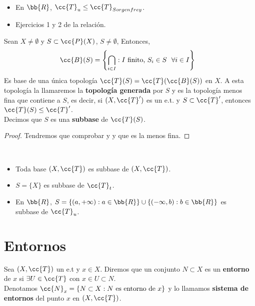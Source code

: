 \begin{ejemplo}\
    \begin{itemize}
        \item En $\bb{R}$, $\cc{T}_u \leq \cc{T}_{Sorgenfrey}$.
        \item Ejercicios 1 y 2 de la relación.
    \end{itemize}
    \endsquare
\end{ejemplo}

\begin{prop}
    Sean $X\neq \emptyset$ y $S\subset \cc{P}(X)$, $S\neq \emptyset$, Entonces, 
    \begin{gather*}
        \cc{B}(S)=\left\{\bigcap\limits_{i\in I}: I \text{ finito, }S_i \in S\ \ \forall i \in I\right\}
    \end{gather*}
    Es base de una única topología $\cc{T}(S)=\cc{T}(\cc{B}(S))$ en $X$. A esta topología la llamaremos la \textbf{topología generada} por $S$ y es la topología menos fina que contiene a $S$, es decir, si $(X,\cc{T}')$ es un e.t. y $S\subset \cc{T}'$, entonces $\cc{T}(S)\leq \cc{T}'$.\\

    Decimos que $S$ es una \textbf{subbase} de $\cc{T}(S)$.

    \begin{proof}
        Tendremos que comprobar  y  y que es la menos fina.
    \end{proof}
\end{prop}

\begin{ejemplo}\
    \begin{itemize}
        \item Toda base $(X,\cc{T})$ es subbase de $(X,\cc{T})$.
        \item $S=\{X\}$ es subbase de $\cc{T}_t$.
        \item En $\bb{R}$, $S=\{(a,+\infty):a\in \bb{R}\}\cup \{(-\infty,b): b\in \bb{R}\}$ es subbase de $\cc{T}_u$.
    \end{itemize}
    \endsquare
\end{ejemplo}

\section{Entornos}

\begin{definicion}
    Sea $(X, \cc{T})$ un e.t y $x\in X$. Diremos que un conjunto $N\subset X$ es un \textbf{entorno} de $x$ si $\exists U \in \cc{T}$ con $x\in U \subset N$.\\

    Denotamos $\cc{N}_x = \{N\subset X : N \text{ es entorno de }x\}$ y lo llamamos \textbf{sistema de entornos} del punto $x$ en $(X,\cc{T})$.
    \endsquare 
\end{definicion}

